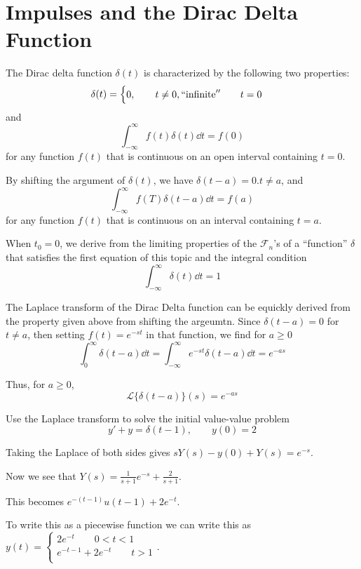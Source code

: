 \documentclass[../diffeq.tex]{subfiles}
\begin{document}
\pagebreak
\section{Impulses and the Dirac Delta Function}
\begin{definition}
    The Dirac delta function $\delta(t)$ is characterized by the following two properties:
    \[ \delta(t)=\begin{cases}
        0, \qquad t\neq 0,
        ``\text{infinite}'' \qquad t=0 
    \end{cases}\]
and 
\[ \int_{-\infty}^{\infty}f(t)\delta (t)\dd t = f(0)\]
for any function $f(t)$ that is continuous on an open interval containing $t=0$.
\end{definition}

By shifting the argument of $\delta(t)$, we have $\delta(t-a)=0. t\neq a$, and 
\[ \int_{-\infty}^{\infty}f(T)\delta(t-a)\dd t = f(a) \]
for any function $f(t)$ that is continuous on an interval containing $t=a$.

When $t_0=0$, we derive from the limiting properties of the $\mathcal{F}_n$'s of a ``function'' $\delta$ that satisfies the first equation of this topic and the integral condition 
\[ \int_{-\infty}^{\infty}\delta(t)\dd t = 1 \]

The Laplace transform of the Dirac Delta function can be equickly derived from the property given above from shifting the argeumtn. Since $\delta(t-a)=0$ for $t\neq a$, then setting $f(t)=e^{-st}$ in that function, we find for $a\geq 0$
\[ \int_0^{\infty}\delta(t-a)\dd t = \int_{-\infty}^{\infty}e^{-st}\delta(t-a)\dd t = e^{-as} \]

Thus, for $a\geq 0$,
\[ \mathcal{L}\{\delta(t-a)\}(s)=e^{-as} \]

\begin{example}
    Use the Laplace transform to solve the initial value-value problem 
    \[ y'+y=\delta(t-1), \qquad y(0)=2 \]

    Taking the Laplace of both sides gives $sY(s)-y(0)+Y(s)= e^{-s}$.

    Now we see that $Y(s)=\frac{1}{s+1}e^{-s}+\frac{2}{s+1}$.

    This becomes $e^{-(t-1)}u(t-1)+2e^{-t}$.

    To write this as a piecewise function we can write this as $y(t)=\begin{cases}
        2e^{-t} \qquad 0<t<1 \\
        e^{-t-1}+2e^{-t} \qquad t>1 \\
    \end{cases}$.
\end{example}
\end{document}
